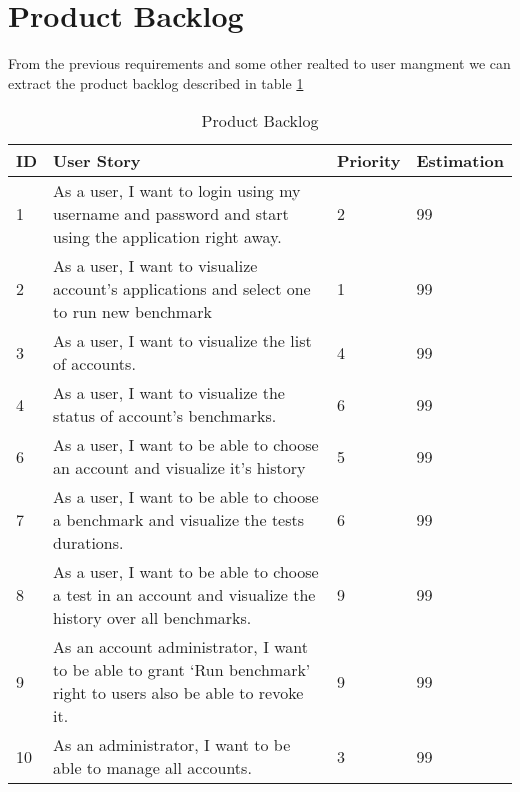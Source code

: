 \section{Product Backlog}
From the previous requirements and some other realted to user mangment we can
extract the product backlog described in table \hyperref[product-backlog]{\ref{product-backlog}}

\begin{table}[!hp]
\caption{Product Backlog}
\label{product-backlog}
\centering
  \begin{tabular}{ | p{2cm}  | p{7cm}  | p{2cm} | p{2cm}| }
    \hline

    ID & User Story                                                                                                        & Priority        & Estimation\\ \hline

    1 & As a user, I want to login using my username and password and start using the application right away.              & 2              & 99        \\ \hline
    2 & As a user, I want to visualize account’s applications and select one to run new benchmark                          & 1              & 99        \\ \hline
    3 & As a user, I want to visualize the list of accounts.                                                               & 4              & 99        \\ \hline
    4 & As a user, I want to visualize the status of account’s benchmarks.                                                 & 6              & 99        \\ \hline
    6 & As a user, I want to be able to choose an account and visualize it’s history                                       & 5              & 99        \\ \hline
    7 & As a user, I want to be able to choose a benchmark and visualize the tests durations.                              & 6              & 99        \\ \hline
    8 & As a user, I want to be able to choose a test in an account and visualize the history over all benchmarks.         & 9              & 99        \\ \hline
    9 & As an account administrator, I want to be able to grant ‘Run benchmark’  right to users also be able to revoke it. & 9              & 99        \\ \hline
    10 & As an administrator, I want to be able to manage all accounts.                                                    & 3              & 99        \\ \hline

    \hline
  \end{tabular}
\end{table}

